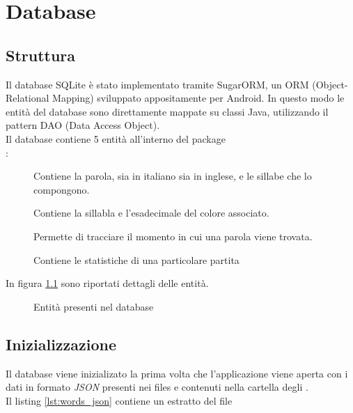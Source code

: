 


\chapter{Database}

\section{Struttura}
\label{structure}
Il database SQLite è stato implementato tramite SugarORM, un ORM (Object-Relational Mapping) sviluppato appositamente per Android. In questo modo le entità del database sono direttamente mappate su classi Java, utilizzando il pattern DAO (Data Access Object).\\
Il database contiene 5 entità all'interno del package \\:
\begin{description}
	\item[] Contiene la parola, sia in italiano sia in inglese, e le sillabe che lo compongono.
	\item[] Contiene la sillabla e l'esadecimale del colore associato.
	\item[] Permette di tracciare il momento in cui una parola viene trovata.
	\item[] Contiene le statistiche di una particolare partita
\end{description}
In figura \ref{fig:entities} sono riportati dettagli delle entità.

\begin{figure}[h!]
\label{fig:entities}
  \centering
  \caption{Entità presenti nel database}
\end{figure}

\section{Inizializzazione}
Il database viene inizializato la prima volta che l'applicazione viene aperta con i dati in formato \textit{JSON} presenti nei files  e  contenuti nella cartella degli .\\
Il listing \ref{lst:words_json} contiene un estratto del file 

